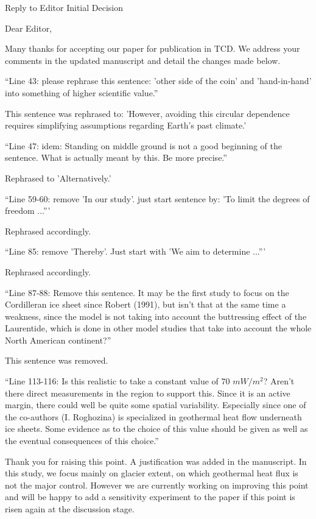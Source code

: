 \documentclass{letter}
\newcommand{\rev}[0]{\color{blue!50!black}\it}
\newcommand{\revpoint}[1]{{\rev\item``#1''}}
\begin{document}
\begin{letter}{Reply to Editor Initial Decision}

\opening{Dear Editor,}

Many thanks for accepting our paper for publication in TCD. We address your comments in the updated manuscript and detail the changes made below.


\begin{itemize}

\revpoint{Line 43: please rephrase this sentence: 'other side of the coin' and 'hand-in-hand' into something of higher scientific value.}

This sentence was rephrased to: 'However, avoiding this circular dependence requires simplifying assumptions regarding Earth's past climate.'

\revpoint{Line 47: idem: Standing on middle ground is not a good beginning of the sentence. What is actually meant by this. Be more precise.}

Rephrased to 'Alternatively.'

\revpoint{Line 59-60: remove 'In our study'. just start sentence by: 'To limit the degrees of freedom ...'}

Rephrased accordingly.

\revpoint{Line 85: remove 'Thereby'. Just start with 'We aim to determine ...'}

Rephrased accordingly.

\revpoint{Line 87-88: Remove this sentence. It may be the first study to focus on the Cordilleran ice sheet since Robert (1991), but isn't that at the same time a weakness, since the model is not taking into account the buttressing effect of the Laurentide, which is done in other model studies that take into account the whole North American continent?}

This sentence was removed.

\revpoint{Line 113-116: Is this realistic to take a constant value of 70 $mW/m^2$? Aren't there direct measurements in the region to support this. Since it is an active margin, there could well be quite some spatial variability. Especially since one of the co-authors (I. Roghozina) is specialized in geothermal heat flow underneath ice sheets. Some evidence as to the choice of this value should be given as well as the eventual consequences of this choice.}

Thank you for raising this point. A justification was added in the manuscript. In this study, we focus mainly on glacier extent, on which geothermal heat flux is not the major control. However we are currently working on improving this point and will be happy to add a sensitivity experiment to the paper if this point is risen again at the discussion stage.


\end{itemize}
\end{letter}
\end{document}
